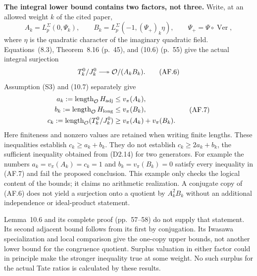 \documentclass[11pt,a4paper]{article}
\theoremstyle{definition}
\renewcommand{\paragraph}[1]{\par\smallskip\noindent\textbf{#1}\quad\ignorespaces}
\providecommand{\longtwoheadrightarrow}{\relbar\joinrel\twoheadrightarrow}
\begin{document}
\paragraph{The integral lower bound contains two factors, not three.}
Write, at an allowed weight $k$ of the cited paper,
\[
 A_k=L_p^\Sigma(0,\Psi_k),\qquad
 B_k=L_p^\Sigma(-1,(\Psi_+)_k\eta),\qquad
 \Psi_+=\Psi\circ\operatorname{Ver},                         \tag{AF.5}
\]
where $\eta$ is the quadratic character of the imaginary quadratic
field.  Equations~(8.3), Theorem~8.16 (p.~45), and (10.6) (p.~55)
give the actual integral surjection
\[
 T^0_k/J^0_k\longtwoheadrightarrow\mathcal O/(A_kB_k).        \tag{AF.6}
\]
Assumption (S3) and (10.7) separately give
\[
 \begin{aligned}
 a_k:=\operatorname{length}_{\mathcal O}H_{\rm adj}
       &\leq v_\pi(A_k),\\
 b_k:=\operatorname{length}_{\mathcal O}H_{\rm long}
       &\leq v_\pi(B_k),\\
 c_k:=\operatorname{length}_{\mathcal O}(T^0_k/J^0_k)
       &\geq v_\pi(A_k)+v_\pi(B_k).
 \end{aligned}                                               \tag{AF.7}
\]
Here finiteness and nonzero values are retained when writing finite
lengths.  These inequalities establish $c_k\geq a_k+b_k$.
They do not establish $c_k\geq2a_k+b_k$, the sufficient inequality
obtained from (D2.14) for two generators.  For example the numbers
$a_k=v_\pi(A_k)=c_k=1$ and $b_k=v_\pi(B_k)=0$ satisfy every
inequality in (AF.7) and fail the proposed conclusion.  This example
only checks the logical content of the bounds; it claims no arithmetic
realization.  A conjugate copy of (AF.6) does not yield a surjection
onto a quotient by $A_k^2B_k$ without an additional independence or
ideal-product statement.

Lemma~10.6 and its complete proof (pp.~57--58) do not supply that
statement.  Its second adjacent bound follows from its first by
conjugation.  Its Iwasawa specialization and local comparison give
the one-copy upper bounds, not another lower bound for the congruence
quotient.  Surplus valuation in either factor could in principle make
the stronger inequality true at some weight.  No such surplus for the
actual Tate ratios is calculated by these results.
\end{document}
